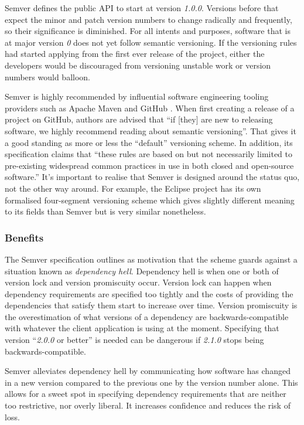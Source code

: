 \documentclass{l4proj}
\begin{document}
Semver defines the public API to start at version \textit{1.0.0}.
Versions before that expect the minor and patch version numbers to
change radically and frequently, so their significance is diminished.
For all intents and purposes, software that is at major version
\textit{0} does not yet follow semantic versioning.
If the versioning rules had started applying from the first ever
release of the project, either the developers would be discouraged
from versioning unstable work or version numbers would balloon.

Semver is highly recommended by influential software engineering
tooling providers such as Apache Maven \cite{MavenRec} and GitHub
\cite{GitHubRec}. When first creating a release of a project on
GitHub, authors are advised that ``if [they] are new to releasing
software, we highly recommend reading about semantic versioning''.
That gives it a good standing as more or less the ``default''
versioning scheme. In addition, its specification claims that
``these rules are based on but not necessarily limited to pre-existing
widespread common practices in use in both closed and open-source
software.'' It's important to realise that Semver is designed around
the status quo, not the other way around. For example, the Eclipse
project has its own formalised four-segment versioning scheme
\cite{EclipseVersions} which gives slightly different meaning to its
fields than Semver but is very similar nonetheless.

\subsubsection{Benefits}

The Semver specification outlines as motivation that the scheme guards
against a situation known as \textit{dependency hell}. Dependency hell
is when one or both of version lock and version promiscuity occur.
Version lock can happen when dependency requirements are specified too
tightly and the costs of providing the dependencies that satisfy them
start to increase over time. Version promiscuity is the overestimation
of what versions of a dependency are backwards-compatible with whatever
the client application is using at the moment. Specifying that version
``\textit{2.0.0} or better'' is needed can be dangerous if
\textit{2.1.0} stops being backwards-compatible.

Semver alleviates dependency hell by communicating how software has
changed in a new version compared to the previous one by the version
number alone. This allows for a sweet spot in specifying dependency
requirements that are neither too restrictive, nor overly liberal.
It increases confidence and reduces the risk of loss.
\end{document}
